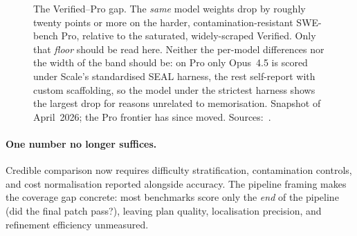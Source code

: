 \documentclass[
  english,        %
  font=times,     %
  twocolumn,      %
]{tumarticle}
\begin{document}
\begin{figure}[t]
  \centering
  \caption{The Verified--Pro gap. The \emph{same} model weights drop by roughly
    twenty points or more on the harder, contamination-resistant SWE-bench Pro,
    relative to the saturated, widely-scraped Verified. Only that \emph{floor} should be
    read here. Neither the per-model differences nor the width of the band should
    be: on Pro only Opus~4.5 is scored under Scale's standardised SEAL harness,
    the rest self-report with custom scaffolding, so the model under the strictest
    harness shows the largest drop for reasons unrelated to memorisation.
    Snapshot of April~2026; the Pro frontier has since moved.
    Sources:~\cite{deng2025swebenchpro,agentmarketcap2026gap}.}
  \label{fig:verified-vs-pro}
\end{figure}

\paragraph{One number no longer suffices.}
Credible comparison now requires difficulty stratification, contamination
controls, and cost normalisation reported alongside accuracy. The pipeline framing
makes the coverage gap concrete: most benchmarks score only the \emph{end} of the
pipeline (did the final patch pass?), leaving plan quality, localisation
precision, and refinement efficiency unmeasured.
\end{document}
